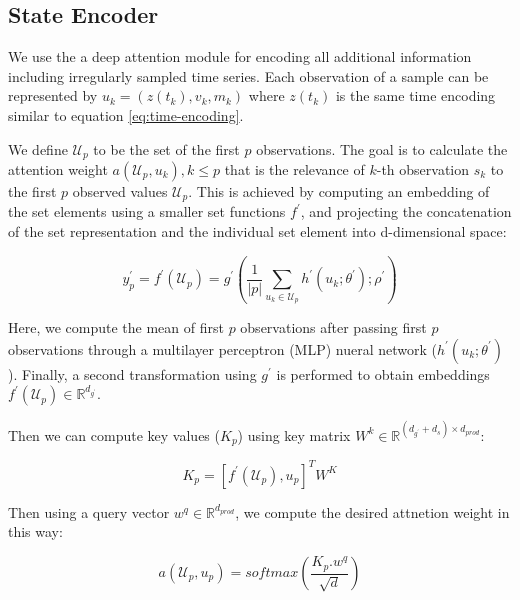\documentclass[journal,twoside,web]{ieeecolor}
\begin{document}
\subsection{State Encoder}

We use the a deep attention module \cite*{hornSetFunctionsTime2020} for encoding all additional information including irregularly sampled time series. Each observation of a sample can be represented by $u_k=(z(t_k), v_k, m_k)$ where $z(t_k)$ is the same time encoding similar to equation \ref{eq:time-encoding}.%

We define $\mathcal{U}_p$ to be the set of the first $p$ observations.
The goal is to calculate the attention weight $a(\mathcal{U}_p,u_k ), k \leq p$ that is the relevance of $k$-th observation $s_k$ to the first $p$ observed values $\mathcal{U}_p$.
This is achieved by computing an embedding of the set elements using a smaller set functions $f^{\prime}$, and projecting the concatenation of the set representation and the individual set element into d-dimensional space:



\begin{equation}\label{eq:fprime}
    y^{\prime}_{p}=f^{\prime}(\mathcal{U}_p) = g^{\prime} \left(  \frac{1}{|p|} \sum_{u_k \in \mathcal{U}_p}  h^{\prime}(u_k;\theta^{\prime}) ;\rho^{\prime}\right) 
\end{equation}

Here, we compute the mean of first $p$ observations after passing first $p$ observations through a multilayer perceptron (MLP) nueral network ($h^{\prime}(u_k;\theta^{\prime})$). Finally, a second transformation using $g^{\prime}$ is performed to obtain embeddings $f^{\prime}(\mathcal{U}_p) \in \mathbb{R}^{d_{g^{\prime}}}$.


Then we can compute key values ($ K_p$) using key matrix $W^k \in \mathbb{R}^{(d_{g^{\prime}}+d_s) \times d_{prod}}$:


\begin{equation}
    K_p=[f^{\prime}(\mathcal{U}_p), u_p]^T W^K   
\end{equation}

Then using a query vector $w^q \in \mathbb{R}^{d_{prod}}$, we compute the desired attnetion weight in this way:

\begin{equation}
    a(\mathcal{U}_p,u_p)=  softmax(\frac{K_p.w^q}{\sqrt{d}  })
\end{equation}
\end{document}
